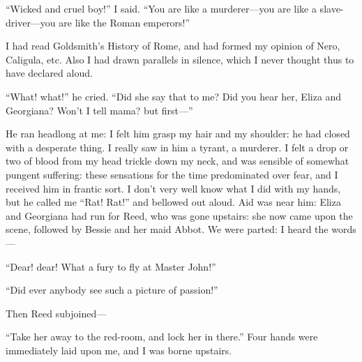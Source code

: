 \enquote{Wicked and cruel boy!} I said. \enquote{You are like a
murderer---you are like a slave-driver---you are like the Roman
emperors!}

I had read Goldsmith's History of Rome, and had formed my opinion of
Nero, Caligula, etc. Also I had drawn parallels in silence, which I
never thought thus to have declared aloud.

\enquote{What! what!} he cried. \enquote{Did she say that to me? Did
you hear her, Eliza and Georgiana? Won't I tell mama? but first---}

He ran headlong at me: I felt him grasp my hair and my shoulder: he had
closed with a desperate thing. I really saw in him a tyrant, a
murderer. I felt a drop or two of blood from my head trickle down my
neck, and was sensible of somewhat pungent suffering: these sensations
for the time predominated over fear, and I received him in frantic
sort. I don't very well know what I did with my hands, but he called me
\enquote{Rat! Rat!} and bellowed out aloud. Aid was near him: Eliza
and Georgiana had run for \Mrs{} Reed, who was gone upstairs: she now came
upon the scene, followed by Bessie and her maid Abbot. We were parted:
I heard the words---

\enquote{Dear! dear! What a fury to fly at Master John!}

\enquote{Did ever anybody see such a picture of passion!}

Then \Mrs{} Reed subjoined---

\enquote{Take her away to the red-room, and lock her in there.} Four
hands were immediately laid upon me, and I was borne upstairs.
